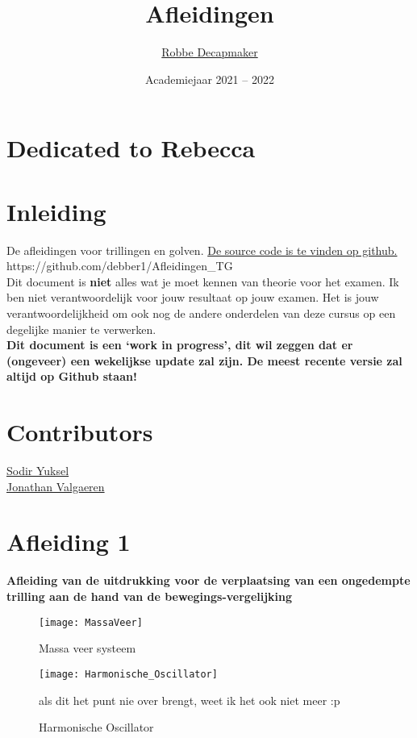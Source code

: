 \documentclass[a4paper,kul]{kulakarticle} %
\date{Academiejaar 2021 -- 2022}
\title{Afleidingen}
\author{\href{https://github.com/debber1}{Robbe Decapmaker}}
\begin{document}
\maketitle
\section*{Dedicated to Rebecca}
\section*{Inleiding}

De afleidingen voor trillingen en golven. \href{https://github.com/debber1/Afleidingen_TG}{De source code is te vinden op github.}\\
https://github.com/debber1/Afleidingen\_TG\\
Dit document is \textbf{niet} alles wat je moet kennen van theorie voor het examen. Ik ben niet verantwoordelijk voor jouw resultaat op jouw examen. Het is jouw verantwoordelijkheid om ook nog de andere onderdelen van deze cursus op een degelijke manier te verwerken. \\
\textbf{Dit document is een `work in progress', dit wil zeggen dat er (ongeveer) een wekelijkse update zal zijn. De meest recente versie zal altijd op Github staan!}

\section*{Contributors}
\href{https://github.com/sydon1}{Sodir Yuksel} \\
\href{https://github.com/ItsAlphie}{Jonathan Valgaeren}

\section{Afleiding 1}

\textbf{Afleiding van de uitdrukking voor de verplaatsing van een ongedempte trilling aan de hand van de bewegings-vergelijking}\\
\begin{figure}[htbp]
	\centering
	\texttt{[image: MassaVeer]}
	\caption[Massa veer systeem]{Massa veer systeem}
	\label{fig:massaveer}
\end{figure}
\begin{figure}[htbp]
	\centering
	\texttt{[image: Harmonische\_Oscillator]}
	\caption[Harmonische Oscillator]{Harmonische Oscillator}
	\label{fig:harmonischeoscilator}als dit het punt nie over brengt, weet ik het ook niet meer :p
\end{figure}
\end{document}
